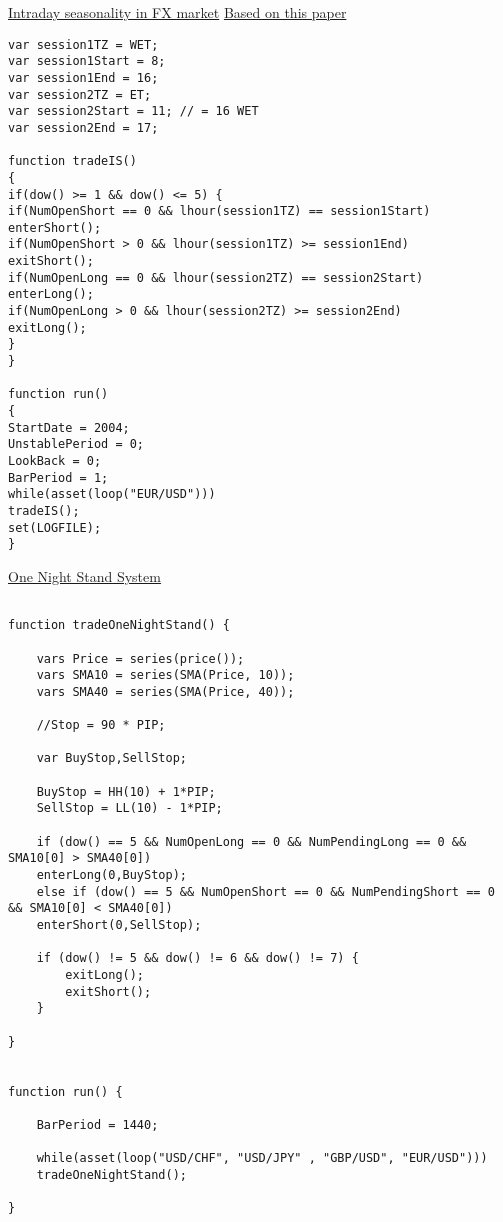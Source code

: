 \href{http://www.opserver.de/ubb7/ubbthreads.php?ubb=showflat&Number=459925#Post459925}{Intraday seasonality in FX market}
\href{http://papers.ssrn.com/sol3/papers.cfm?abstract_id=2613592}{Based on this paper}
\begin{lstlisting}[caption=Intraday seasonality in FX market System]
var session1TZ = WET;
var session1Start = 8;
var session1End = 16;
var session2TZ = ET;
var session2Start = 11; // = 16 WET
var session2End = 17;

function tradeIS()
{
if(dow() >= 1 && dow() <= 5) {
if(NumOpenShort == 0 && lhour(session1TZ) == session1Start)
enterShort();
if(NumOpenShort > 0 && lhour(session1TZ) >= session1End)
exitShort();
if(NumOpenLong == 0 && lhour(session2TZ) == session2Start)
enterLong();	
if(NumOpenLong > 0 && lhour(session2TZ) >= session2End)
exitLong();
}
}

function run()
{
StartDate = 2004;
UnstablePeriod = 0;
LookBack = 0;
BarPeriod = 1;
while(asset(loop("EUR/USD")))
tradeIS();
set(LOGFILE);
}

\end{lstlisting}

\href{http://www.opserver.de/ubb7/ubbthreads.php?ubb=showflat&Number=452807&page=1}{One Night Stand System}
 
\begin{lstlisting}[caption=One Night Stand System]

function tradeOneNightStand() {
	
	vars Price = series(price());
	vars SMA10 = series(SMA(Price, 10));
	vars SMA40 = series(SMA(Price, 40));
	
	//Stop = 90 * PIP;
	
	var BuyStop,SellStop;
	
	BuyStop = HH(10) + 1*PIP;
	SellStop = LL(10) - 1*PIP;
	
	if (dow() == 5 && NumOpenLong == 0 && NumPendingLong == 0 && SMA10[0] > SMA40[0]) 
	enterLong(0,BuyStop);
	else if (dow() == 5 && NumOpenShort == 0 && NumPendingShort == 0 && SMA10[0] < SMA40[0])
	enterShort(0,SellStop);			
	
	if (dow() != 5 && dow() != 6 && dow() != 7) {
		exitLong();
		exitShort();
	}
	
}


function run() {
	
	BarPeriod = 1440;
	
	while(asset(loop("USD/CHF", "USD/JPY" , "GBP/USD", "EUR/USD")))
	tradeOneNightStand();
	
}
\end{lstlisting}

